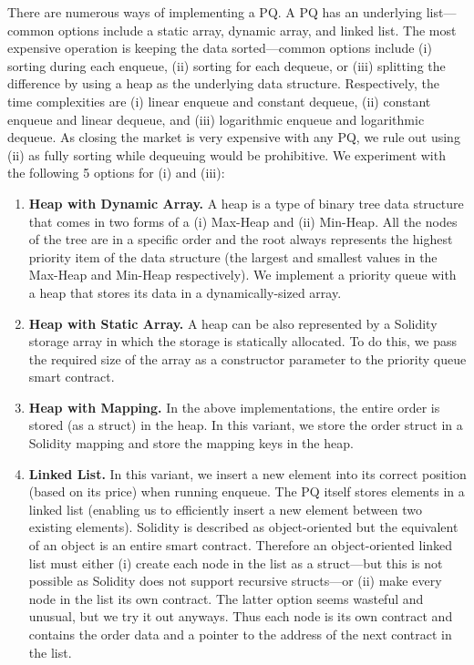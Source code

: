 There are numerous ways of implementing a PQ. A PQ has an underlying list---common options include a static array, dynamic array, and linked list. The most expensive operation is keeping the data sorted---common options include (i) sorting during each enqueue, (ii) sorting for each dequeue, or (iii) splitting the difference by using a heap as the underlying data structure. Respectively, the time complexities are (i) linear enqueue and constant dequeue, (ii) constant enqueue and linear dequeue, and (iii) logarithmic enqueue and logarithmic dequeue. As closing the market is very expensive with any PQ, we rule out using (ii) as fully sorting while dequeuing would be prohibitive. We experiment with the following 5 options for (i) and (iii):

\begin{enumerate}

\item \textbf{Heap with Dynamic Array.} A heap is a type of binary tree data structure that comes in two forms of a (i) Max-Heap and (ii) Min-Heap. All the nodes of the tree are in a specific order and the root always represents the highest priority item of the data structure (the largest and smallest values in the Max-Heap and Min-Heap respectively). We implement a priority queue with a heap that stores its data in a dynamically-sized array. 

\item \textbf{Heap with Static Array.} A heap can be also represented by a Solidity storage array in which the storage is statically allocated. To do this, we pass the required size of the array as a constructor parameter to the priority queue smart contract. 

\item \textbf{Heap with Mapping.} In the above implementations, the entire order is stored (as a struct) in the heap. In this variant, we store the order struct in a Solidity mapping and store the mapping keys in the heap.  

\item \textbf{Linked List.} In this variant, we insert a new element into its correct position (based on its price) when running enqueue. The PQ itself stores elements in a linked list (enabling us to efficiently insert a new element between two existing elements). Solidity is described as object-oriented but the equivalent of an object is an entire smart contract. Therefore an object-oriented linked list must either (i) create each node in the list as a struct---but this is not possible as Solidity does not support recursive structs---or (ii) make every node in the list its own contract. The latter option seems wasteful and unusual, but we try it out anyways. Thus each node is its own contract and contains the order data and a pointer to the address of the next contract in the list.


\end{enumerate}
